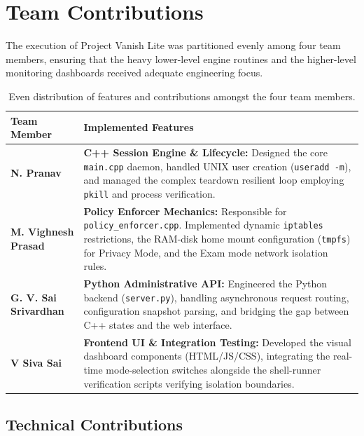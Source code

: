 \chapter{Team Contributions}

The execution of Project Vanish Lite was partitioned evenly among four team members, ensuring that the heavy lower-level engine routines and the higher-level monitoring dashboards received adequate engineering focus.

\begin{table}[h]
    \centering
    \renewcommand{\arraystretch}{1.5}
    \begin{tabularx}{\textwidth}{|>{\bfseries}l|X|}
    \hline
    \rowcolor
    Team Member & Implemented Features \\
    \hline
    N. Pranav & \textbf{C++ Session Engine \& Lifecycle:} Designed the core \texttt{main.cpp} daemon, handled UNIX user creation (\texttt{useradd -m}), and managed the complex teardown resilient loop employing \texttt{pkill} and process verification. \\
    \hline
    M. Vighnesh Prasad & \textbf{Policy Enforcer Mechanics:} Responsible for \texttt{policy\_enforcer.cpp}. Implemented dynamic \texttt{iptables} restrictions, the RAM-disk home mount configuration (\texttt{tmpfs}) for Privacy Mode, and the Exam mode network isolation rules. \\
    \hline
    G. V. Sai Srivardhan & \textbf{Python Administrative API:} Engineered the Python backend (\texttt{server.py}), handling asynchronous request routing, configuration snapshot parsing, and bridging the gap between C++ states and the web interface. \\
    \hline
    V Siva Sai & \textbf{Frontend UI \& Integration Testing:} Developed the visual dashboard components (HTML/JS/CSS), integrating the real-time mode-selection switches alongside the shell-runner verification scripts verifying isolation boundaries. \\
    \hline
    \end{tabularx}
    \caption{Even distribution of features and contributions amongst the four team members.}
    \label{tab:contributions}
\end{table}

\section{Technical Contributions}

